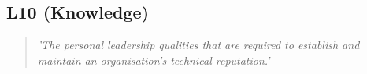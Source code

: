 \subsection{L10 (Knowledge)}

  \begin{quote}
    \textit{'The personal leadership qualities that
    are required to establish and maintain an organisation’s
    technical reputation.'}
  \end{quote}

\newpage